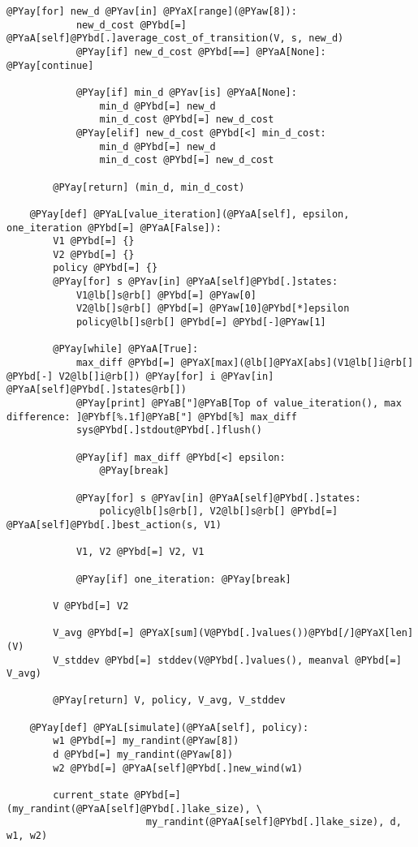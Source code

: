 \begin{Verbatim}[commandchars=@\[\]]
        @PYay[for] new_d @PYav[in] @PYaX[range](@PYaw[8]):
            new_d_cost @PYbd[=] @PYaA[self]@PYbd[.]average_cost_of_transition(V, s, new_d)
            @PYay[if] new_d_cost @PYbd[==] @PYaA[None]: @PYay[continue]

            @PYay[if] min_d @PYav[is] @PYaA[None]:
                min_d @PYbd[=] new_d
                min_d_cost @PYbd[=] new_d_cost
            @PYay[elif] new_d_cost @PYbd[<] min_d_cost:
                min_d @PYbd[=] new_d
                min_d_cost @PYbd[=] new_d_cost

        @PYay[return] (min_d, min_d_cost)

    @PYay[def] @PYaL[value_iteration](@PYaA[self], epsilon, one_iteration @PYbd[=] @PYaA[False]):
        V1 @PYbd[=] {}
        V2 @PYbd[=] {}
        policy @PYbd[=] {}
        @PYay[for] s @PYav[in] @PYaA[self]@PYbd[.]states:
            V1@lb[]s@rb[] @PYbd[=] @PYaw[0]
            V2@lb[]s@rb[] @PYbd[=] @PYaw[10]@PYbd[*]epsilon
            policy@lb[]s@rb[] @PYbd[=] @PYbd[-]@PYaw[1]

        @PYay[while] @PYaA[True]:
            max_diff @PYbd[=] @PYaX[max](@lb[]@PYaX[abs](V1@lb[]i@rb[] @PYbd[-] V2@lb[]i@rb[]) @PYay[for] i @PYav[in] @PYaA[self]@PYbd[.]states@rb[])
            @PYay[print] @PYaB["]@PYaB[Top of value_iteration(), max difference: ]@PYbf[%.1f]@PYaB["] @PYbd[%] max_diff
            sys@PYbd[.]stdout@PYbd[.]flush()

            @PYay[if] max_diff @PYbd[<] epsilon:
                @PYay[break]

            @PYay[for] s @PYav[in] @PYaA[self]@PYbd[.]states:
                policy@lb[]s@rb[], V2@lb[]s@rb[] @PYbd[=] @PYaA[self]@PYbd[.]best_action(s, V1)

            V1, V2 @PYbd[=] V2, V1

            @PYay[if] one_iteration: @PYay[break]

        V @PYbd[=] V2

        V_avg @PYbd[=] @PYaX[sum](V@PYbd[.]values())@PYbd[/]@PYaX[len](V)
        V_stddev @PYbd[=] stddev(V@PYbd[.]values(), meanval @PYbd[=] V_avg)

        @PYay[return] V, policy, V_avg, V_stddev

    @PYay[def] @PYaL[simulate](@PYaA[self], policy):
        w1 @PYbd[=] my_randint(@PYaw[8])
        d @PYbd[=] my_randint(@PYaw[8])
        w2 @PYbd[=] @PYaA[self]@PYbd[.]new_wind(w1)

        current_state @PYbd[=] (my_randint(@PYaA[self]@PYbd[.]lake_size), \
                        my_randint(@PYaA[self]@PYbd[.]lake_size), d, w1, w2)


\end{Verbatim}
